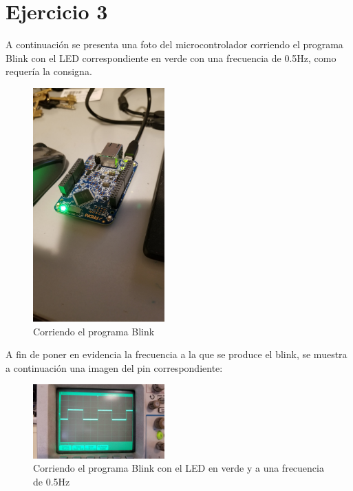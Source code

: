 \documentclass[micros_g1_main.tex]{subfiles}
\begin{document}
\section{Ejercicio 3}
A continuación se presenta una foto del microcontrolador corriendo el programa Blink con el LED correspondiente en verde con una frecuencia de 0.5Hz, como requería la consigna.
	\begin{figure}[H]
		\centering
		\includegraphics[width=0.45\textwidth]{images/blink_green.jpg}
		\caption{Corriendo el programa Blink} \label{fig:cct}
	\end{figure}

A fin de poner en evidencia la frecuencia a la que se produce el blink, se muestra a continuación una imagen del pin correspondiente:
	\begin{figure}[H]
		\centering
		\includegraphics[width=0.45\textwidth]{images/blink_green_1s.jpeg}
		\caption{Corriendo el programa Blink con el LED en verde y a una frecuencia de 0.5Hz} \label{fig:cct}
	\end{figure}
\end{document}
